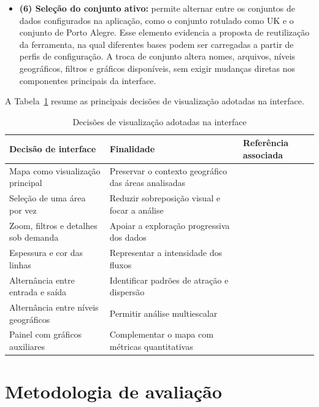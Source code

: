 \documentclass[12pt]{article}
\begin{document}
\begin{itemize}
    \item \textbf{(6) Seleção do conjunto ativo:} permite alternar entre os conjuntos de dados configurados na aplicação, como o conjunto rotulado como UK e o conjunto de Porto Alegre. Esse elemento evidencia a proposta de reutilização da ferramenta, na qual diferentes bases podem ser carregadas a partir de perfis de configuração. A troca de conjunto altera nomes, arquivos, níveis geográficos, filtros e gráficos disponíveis, sem exigir mudanças diretas nos componentes principais da interface.
\end{itemize}

A Tabela~\ref{tab:decisoes-interface} resume as principais decisões de visualização adotadas na interface.

\begin{table}[ht]
\centering
\footnotesize
\caption{Decisões de visualização adotadas na interface}
\label{tab:decisoes-interface}
\begin{tabular}{p{3.6cm} p{5.6cm} p{3.6cm}}
\hline
\textbf{Decisão de interface} & \textbf{Finalidade} & \textbf{Referência associada} \\
\hline
Mapa como visualização principal & Preservar o contexto geográfico das áreas analisadas & \cite{Dodge04072021,s19020332} \\
\hline
Seleção de uma área por vez & Reduzir sobreposição visual e focar a análise & \cite{Wood01052010} \\
\hline
Zoom, filtros e detalhes sob demanda & Apoiar a exploração progressiva dos dados & \cite{shneiderman1996} \\
\hline
Espessura e cor das linhas & Representar a intensidade dos fluxos & \cite{munzner2009} \\
\hline
Alternância entre entrada e saída & Identificar padrões de atração e dispersão & \cite{Dodge04072021} \\
\hline
Alternância entre níveis geográficos & Permitir análise multiescalar & \cite{schottler2021visualizing} \\
\hline
Painel com gráficos auxiliares & Complementar o mapa com métricas quantitativas & \cite{s19020332} \\
\hline
\end{tabular}
\end{table}

\section{Metodologia de avaliação}
\label{sec:metodologia-avaliacao}
\end{document}
